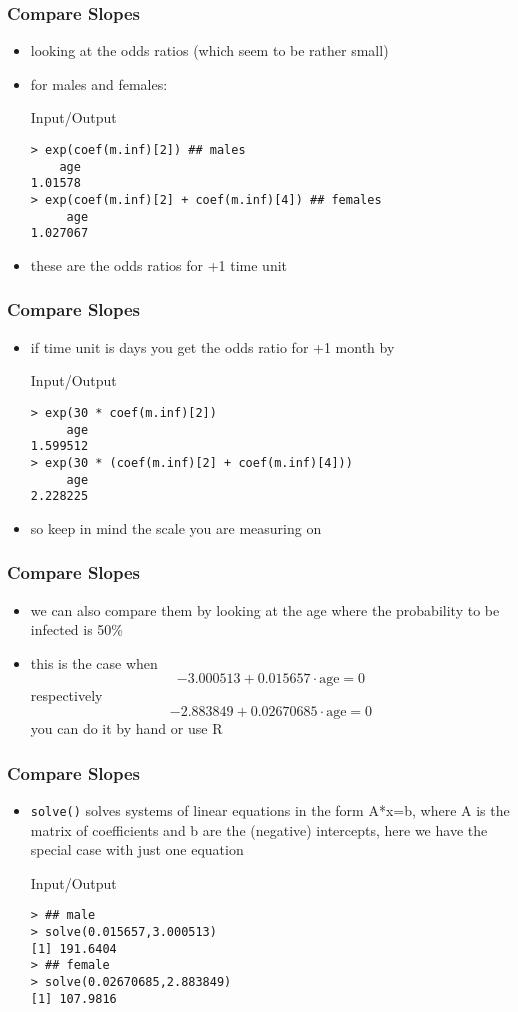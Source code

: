 \begin{frame}[fragile]\frametitle{Compare Slopes}
\begin{itemize}
\item looking at the odds ratios (which seem to be rather small)
\item for males and females:
  \begin{exampleblock}{Input/Output}\small
\begin{verbatim}
> exp(coef(m.inf)[2]) ## males
    age 
1.01578 
> exp(coef(m.inf)[2] + coef(m.inf)[4]) ## females
     age  
1.027067 
\end{verbatim}
  \end{exampleblock}
\item these are the odds ratios for +1 time unit
\end{itemize}
\end{frame}

\begin{frame}[fragile]\frametitle{Compare Slopes}
  \begin{itemize}
  \item if time unit is days you get the odds ratio for +1 month   by
  \begin{exampleblock}{Input/Output}\small
\begin{verbatim}
> exp(30 * coef(m.inf)[2])
     age 
1.599512 
> exp(30 * (coef(m.inf)[2] + coef(m.inf)[4]))
     age 
2.228225 
\end{verbatim}
  \end{exampleblock}
\item so keep in mind the scale you are measuring on
\end{itemize}
\end{frame}

  \begin{frame}[fragile]\frametitle{Compare Slopes}
\begin{itemize}
\item we can also compare them by looking at the age where the probability to be infected is 50\%
\item this is the case when $$-3.000513 + 0.015657 \cdot \mbox{age}=0$$  respectively $$-2.883849 + 0.02670685  \cdot \mbox{age}=0$$ you can do it by hand or use R
\end{itemize}
\end{frame}

\begin{frame}[fragile]\frametitle{Compare Slopes}
\begin{itemize}
\item \texttt{solve()} solves systems of linear equations in the form A*x=b, where A is the matrix of coefficients and b are the (negative) intercepts, here we have the special case with just one equation
  \begin{exampleblock}{Input/Output}\small
\begin{verbatim}
> ## male
> solve(0.015657,3.000513)
[1] 191.6404
> ## female
> solve(0.02670685,2.883849)
[1] 107.9816
\end{verbatim}
  \end{exampleblock}

\end{itemize}
\end{frame}

